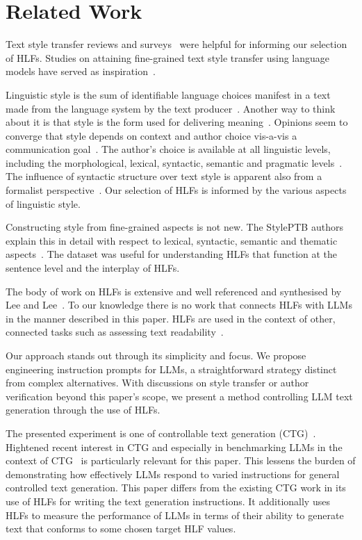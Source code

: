 \documentclass[11pt]{article}
\begin{document}
\section{Related Work}\label{related}

Text style transfer reviews and surveys~\cite{tst-review-2021,tst-survey-2022}
were helpful for informing our selection of HLFs.
Studies on attaining fine-grained text style transfer using language models
have served as inspiration~\cite{lyu-etal-2023-fine}.

Linguistic style is the sum of identifiable language choices manifest in a text
made from the language system by the text producer~\cite{lugea2023stylistics}.
Another way to think about it is that style is the form used for delivering
meaning~\cite{tst_sigkdd_review_2022}.
Opinions seem to converge that style depends on context and author choice
vis-a-vis a communication goal~\cite{mcdonald1985computational,hovy1987generating}.
The author's choice is available at all linguistic levels, including the
morphological, lexical, syntactic, semantic and pragmatic
levels~\cite{dimarco1994model,lugea2023stylistics}.
The influence of syntactic structure over text style is apparent also from a
formalist perspective~\cite{chomsky2002syntactic}.
Our selection of HLFs is informed by the various aspects of linguistic style.

Constructing style from fine-grained aspects is not new.
The StylePTB authors explain this in detail with respect to lexical,
syntactic, semantic and thematic aspects~\cite{lyu-etal-2021-styleptb}.
The dataset was useful for understanding HLFs that function at the sentence
level and the interplay of HLFs.

The body of work on HLFs is extensive and well referenced and synthesised by
Lee and Lee~\cite{lftk-2023}.
To our knowledge there is no work that connects HLFs with LLMs in the manner
described in this paper.
HLFs are used in the context of other, connected tasks such as assessing text
readability~\cite{lee-etal-2021-pushing}.

Our approach stands out through its simplicity and focus.
We propose engineering instruction prompts for LLMs, a straightforward strategy
distinct from complex alternatives.
With discussions on style transfer or author verification beyond this paper's
scope, we present a method controlling LLM text generation through the use of
HLFs.

The presented experiment is one of controllable text
generation (CTG)~\cite{zhang-ctg-2022}.
Hightened recent interest in CTG and especially in benchmarking LLMs in the
context of CTG~\cite{chen2024benchmarking} is particularly relevant for this
paper.
This lessens the burden of demonstrating how effectively LLMs respond to varied
instructions for general controlled text generation.
This paper differs from the existing CTG work in its use of HLFs for writing
the text generation instructions.
It additionally uses HLFs to measure the performance of LLMs in terms of their
ability to generate text that conforms to some chosen target HLF values.
\end{document}
